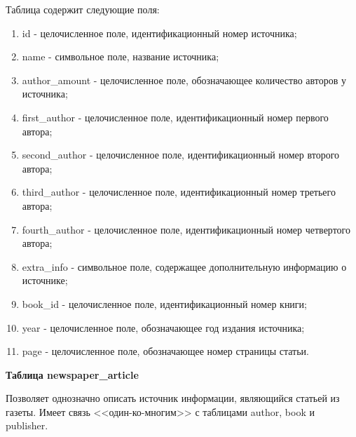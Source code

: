 Таблица содержит следующие поля:
\begin{enumerate}
	\item id - целочисленное поле, идентификационный номер источника;
	\item name - символьное поле, название источника;
	\item author\_amount - целочисленное поле, обозначающее количество авторов у источника;
	\item first\_author - целочисленное поле, идентификационный номер первого автора;
	\item second\_author - целочисленное поле, идентификационный номер второго автора;
	\item third\_author - целочисленное поле, идентификационный номер третьего автора;
	\item fourth\_author - целочисленное поле, идентификационный номер четвертого автора;
	\item extra\_info - символьное поле, содержащее дополнительную информацию о источнике;
	\item book\_id - целочисленное поле, идентификационный номер книги;
	\item year - целочисленное поле, обозначающее год издания источника;
	\item page - целочисленное поле, обозначающее номер страницы статьи.
\end{enumerate}

\hfill \break

{\bf Таблица newspaper\_article}

Позволяет однозначно описать источник информации, являющийся  статьей из газеты. Имеет связь <<один-ко-многим>> с таблицами author, book и publisher. 


